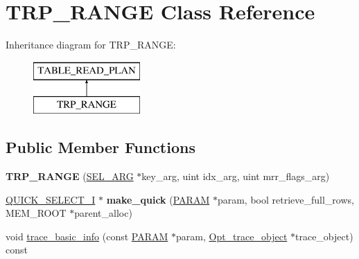 \hypertarget{classTRP__RANGE}{}\section{T\+R\+P\+\_\+\+R\+A\+N\+GE Class Reference}
\label{classTRP__RANGE}
Inheritance diagram for T\+R\+P\+\_\+\+R\+A\+N\+GE\+:\begin{figure}[H]
\begin{center}
\leavevmode
\includegraphics[height=2.000000cm]{classTRP__RANGE}
\end{center}
\end{figure}
\subsection*{Public Member Functions}
\begin{DoxyCompactItemize}
\item 
\mbox{\label{classTRP__RANGE_a7e6e879acfe4c820dbd2114bee93ce80}} 
{\bfseries T\+R\+P\+\_\+\+R\+A\+N\+GE} (\mbox{\hyperlink{classSEL__ARG}{S\+E\+L\+\_\+\+A\+RG}} $\ast$key\+\_\+arg, uint idx\+\_\+arg, uint mrr\+\_\+flags\+\_\+arg)
\item 
\mbox{\label{classTRP__RANGE_a168c5041981be62f9bf21927ffb528aa}} 
\mbox{\hyperlink{classQUICK__SELECT__I}{Q\+U\+I\+C\+K\+\_\+\+S\+E\+L\+E\+C\+T\+\_\+I}} $\ast$ {\bfseries make\+\_\+quick} (\mbox{\hyperlink{classPARAM}{P\+A\+R\+AM}} $\ast$param, bool retrieve\+\_\+full\+\_\+rows, M\+E\+M\+\_\+\+R\+O\+OT $\ast$parent\+\_\+alloc)
\item 
void \mbox{\hyperlink{classTRP__RANGE_a825eead18ac6efe593cc6bf85006d6d7}{trace\+\_\+basic\+\_\+info}} (const \mbox{\hyperlink{classPARAM}{P\+A\+R\+AM}} $\ast$param, \mbox{\hyperlink{classOpt__trace__object}{Opt\+\_\+trace\+\_\+object}} $\ast$trace\+\_\+object) const
\end{DoxyCompactItemize}
